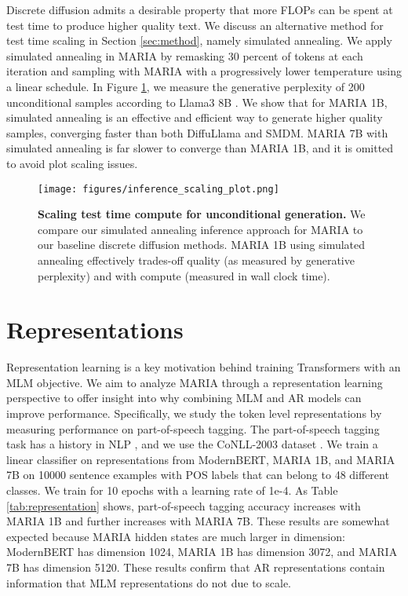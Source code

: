 Discrete diffusion admits a desirable property that more FLOPs can be spent at test time to produce higher quality text. We discuss an alternative method for test time scaling in Section \ref{sec:method}, namely simulated annealing. We apply simulated annealing in MARIA by remasking 30 percent of tokens at each iteration and sampling with MARIA with a progressively lower temperature using a linear schedule. In Figure \ref{fig:inference_scale}, we measure the generative perplexity of 200 unconditional samples according to Llama3 8B \cite{grattafiori2024llama3herdmodels}. We show that for MARIA 1B, simulated annealing is an effective and efficient way to generate higher quality samples, converging faster than both DiffuLlama and SMDM. MARIA 7B with simulated annealing is far slower to converge than MARIA 1B, and it is omitted to avoid plot scaling issues.

\begin{figure}[t]
    \centering
    \texttt{[image: figures/inference\_scaling\_plot.png]}
    \caption{\textbf{Scaling test time compute for unconditional generation.} We compare our simulated annealing inference approach for MARIA to our baseline discrete diffusion methods. MARIA 1B using simulated annealing effectively trades-off quality (as measured by generative perplexity) and with compute (measured in wall clock time).}
    \label{fig:inference_scale}
\end{figure}

\section*{Representations}

Representation learning is a key motivation behind training Transformers with an MLM objective. We aim to analyze MARIA through a representation learning perspective to offer insight into why combining MLM and AR models can improve performance. Specifically, we study the token level representations by measuring performance on part-of-speech tagging. The part-of-speech tagging task has a history in NLP \cite{manning2011part}, and we use the CoNLL-2003 dataset \cite{sang2003introductionconll2003sharedtask}. We train a linear classifier on representations from ModernBERT, MARIA 1B, and MARIA 7B on 10000 sentence examples with POS labels that can belong to 48 different classes. We train for 10 epochs with a learning rate of 1e-4. As Table \ref{tab:representation} shows, part-of-speech tagging accuracy increases with MARIA 1B and further increases with MARIA 7B. These results are somewhat expected because MARIA hidden states are much larger in dimension: ModernBERT has dimension 1024, MARIA 1B has dimension 3072, and MARIA 7B has dimension 5120. These results confirm that AR representations contain information that MLM representations do not due to scale.

